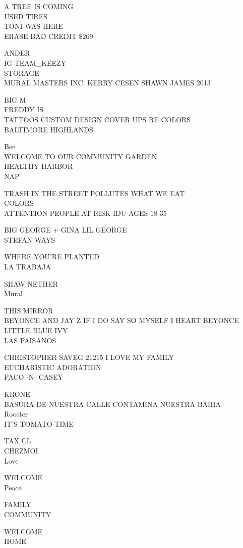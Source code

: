 \documentclass[10pt,letterpaper]{article}
\begin{document}
A TREE IS COMING\\
USED TIRES\\
TONI WAS HERE\\
ERASE BAD CREDIT \$269

ANDER\\
IG TEAM\_KEEZY\\
STORAGE\\
MURAL MASTERS INC. KERRY CESEN SHAWN JAMES 2013

BIG M\\
FREDDY IS\\
TATTOOS CUSTOM DESIGN COVER UPS RE COLORS\\
BALTIMORE HIGHLANDS

Bee\\
WELCOME TO OUR COMMUNITY GARDEN\\
HEALTHY HARBOR\\
NAP

TRASH IN THE STREET POLLUTES WHAT WE EAT\\
COLORS\\
ATTENTION PEOPLE AT RISK IDU AGES 18{-}35

BIG GEORGE + GINA LIL GEORGE\\
STEFAN WAYS

WHERE YOU'RE PLANTED\\
LA TRABAJA

SHAW NETHER\\
Mural

THIS MIRROR\\
BEYONCE AND JAY Z IF I DO SAY SO MYSELF I HEART BEYONCE LITTLE BLUE IVY\\
LAS PAISANOS

CHRISTOPHER SAVEG 21215 I LOVE MY FAMILY\\
EUCHARISTIC ADORATION\\
PACO {-}N{-} CASEY

KRONE\\
BASURA DE NUESTRA CALLE CONTAMINA NUESTRA BAHIA\\
Rooster\\
IT'S TOMATO TIME

TAX CL\\
CHEZMOI\\
Love

WELCOME\\
Peace

FAMILY\\
COMMUNITY

WELCOME\\
HOME
\end{document}
